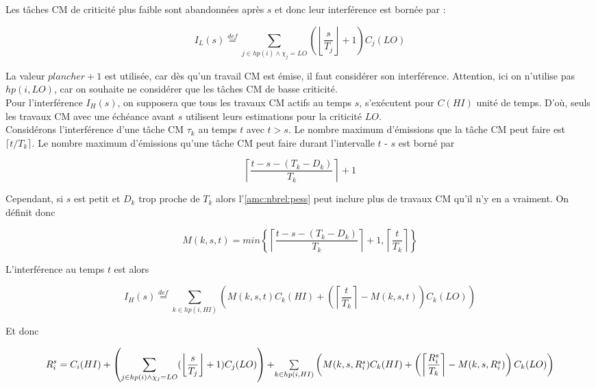 \documentclass[12pt,a4paper,oneside]{book}
\theoremstyle{break}
\theoremstyle{breakplain}
\begin{document}
\pagebreak

Les tâches CM de criticité plus faible sont abandonnées après $s$ et donc leur interférence est bornée par :

\begin{equation}
I_L(s) \overset{def}{=} \underset{j \in hp(i) \wedge \chi_j = LO}{\sum} (\left\lfloor \dfrac{s}{T_j} \right\rfloor + 1) C_j(LO)
\end{equation}

La valeur $plancher +1$ est utilisée, car dès qu'un travail CM est émise, il faut considérer son interférence. Attention, ici on n'utilise pas $hp(i, LO)$, car on souhaite ne considérer que les tâches CM de basse criticité.\\

Pour l'interférence $I_H(s)$, on supposera que tous les travaux CM actifs au temps $s$, s'exécutent pour $C(HI)$ unité de temps. D'où, seuls les travaux CM avec une échéance avant $s$ utilisent leurs estimations pour la criticité $LO$.\\

Considérons l'interférence d'une tâche CM $\tau_k$ au temps $t$ avec $t > s$. Le nombre maximum d'émissions que la tâche CM peut faire est $\lceil t / T_k \rceil$. Le nombre maximum d'émissions qu'une tâche CM peut faire durant l'intervalle $t$ - $s$ est borné par 

\begin{equation}
\label{amc:nbrel:pess}
\left\lceil \dfrac{t-s-(T_k-D_k)}{T_k} \right\rceil +1
\end{equation}

Cependant, si $s$ est petit et $D_k$ trop proche de $T_k$ alors l'\autoref{amc:nbrel:pess} peut inclure plus de travaux CM qu'il n'y en a vraiment. On définit donc

\begin{equation}
M(k,s,t) = min \left\lbrace \left\lceil \dfrac{t-s-(T_k-D_k)}{T_k} \right\rceil +1, \left\lceil \dfrac{t}{T_k} \right\rceil \right\rbrace
\end{equation}

L'interférence au temps $t$ est alors

\begin{equation}
I_H(s) \overset{def}{=} \underset{k \in hp(i, HI)}{\sum} \left( M(k,s,t)C_k(HI) + \left(\left\lceil \dfrac{t}{T_k} \right\rceil - M(k,s,t)\right) C_k(LO) \right)
\end{equation}

Et donc 

\begin{equation}
R_i^s = C_i(HI) + \left( \underset{j \in hp(i) \wedge \chi_j = LO}{\sum} (\left\lfloor \dfrac{s}{T_j} \right\rfloor + 1) C_j(LO) \right) +$$\\$$\underset{k \in hp(i, HI)}{\sum} \left( M(k,s,R_i^s)C_k(HI) + \left(\left\lceil \dfrac{R_i^s}{T_k} \right\rceil - M(k,s,R_i^s)\right) C_k(LO) \right)
\end{equation}
\end{document}

